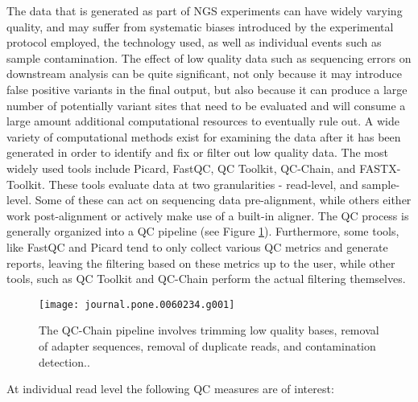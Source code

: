 The data that is generated as part of NGS experiments can have widely varying quality, and may suffer from systematic biases introduced by the experimental protocol employed, the technology used, as well as individual events such as sample contamination\autocites{lauss2013monitoring}{aird2011analyzing}{dohm2008substantial}{cibulskis2011contest}. The effect of low quality data such as sequencing errors on downstream analysis can be quite significant, not only because it may introduce false positive variants in the final output, but also because it can produce a large number of potentially variant sites that need to be evaluated and will consume a large amount additional computational resources to eventually rule out. A wide variety of computational methods exist for examining the data after it has been generated in order to identify and fix or filter out low quality data. The most widely used tools include Picard\autocite{Picard2018toolkit}, FastQC\autocite{andrews2010fastqc}, QC Toolkit\autocite{patel2012ngs}, QC-Chain\autocite{zhou2013qc}, and FASTX-Toolkit\autocite{gordon2010fastx}. These tools evaluate data at two granularities - read-level, and sample-level. Some of these can act on sequencing data pre-alignment, while others either work post-alignment or actively make use of a built-in aligner. The QC process is generally organized into a QC pipeline (see Figure \ref{fig:qc-chain}). Furthermore, some tools, like FastQC and Picard tend to only collect various QC metrics and generate reports, leaving the filtering based on these metrics up to the user, while other tools, such as QC Toolkit and QC-Chain perform the actual filtering themselves.

\begin{figure}[h!]
    \texttt{[image: journal.pone.0060234.g001]}
    \centering
    \caption {The QC-Chain pipeline involves trimming low quality bases, removal of adapter sequences, removal of duplicate reads, and contamination detection.\autocite{zhou2013qc}.}
    \label{fig:qc-chain}
\end{figure}

At individual read level the following QC measures are of interest:

